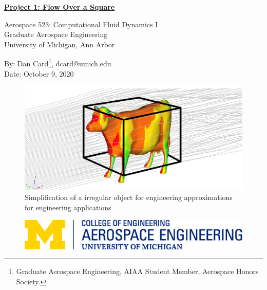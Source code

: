     \thispagestyle{empty}
    \begin{center}
        \textbf{{\LARGE{\underline{Project 1: Flow Over a Square}}}}

        \vspace{0.25cm}
        Aerospace 523: Computational Fluid Dynamics I
        \\ Graduate Aerospace Engineering
        \\ University of Michigan, Ann Arbor
        
        \vspace{0.25cm}
        By: Dan Card\footnote{Graduate Aerospace Engineering, AIAA Student Member, Aerospace Honors Society.}, dcard@umich.edu
        \\ Date: October 9, 2020


        \vspace{1.5in}
        \begin{figure}[h]
            \centering
            \includegraphics[width = \linewidth]{rep/cover.jpg}
            \caption*{Simplification of a irregular object for engineering approximations for engineering applications}
        \end{figure}

    \end{center}

    \vfill

    \pagebreak
    {
        \begin{figure}[h]
            \includegraphics[width=\linewidth]{rep/aero.jpg}
        \end{figure}

        \tableofcontents
        \pagebreak
        \listoffigures
        \lstlistoflistings
        \listofmyequations
        \thispagestyle{empty}
    }